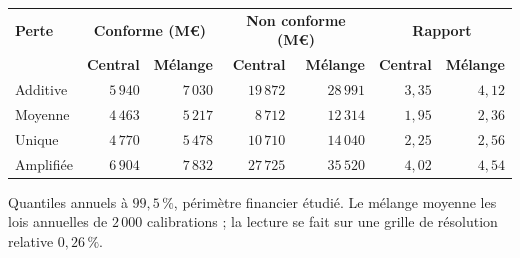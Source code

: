 \begin{center}\footnotesize
\renewcommand{\arraystretch}{1.15}
\begin{tabular}{@{}lrrrrrr@{}}
\toprule
\textbf{Perte} & \multicolumn{2}{c}{\textbf{Conforme (M\euro)}} & \multicolumn{2}{c}{\textbf{Non conforme (M\euro)}} & \multicolumn{2}{c}{\textbf{Rapport}} \\
 & \textbf{Central} & \textbf{Mélange} & \textbf{Central} & \textbf{Mélange} & \textbf{Central} & \textbf{Mélange} \\
\midrule
Additive & $5\,940$ & $7\,030$ & $19\,872$ & $28\,991$ & $3{,}35$ & $4{,}12$ \\
Moyenne & $4\,463$ & $5\,217$ & $8\,712$ & $12\,314$ & $1{,}95$ & $2{,}36$ \\
Unique & $4\,770$ & $5\,478$ & $10\,710$ & $14\,040$ & $2{,}25$ & $2{,}56$ \\
Amplifiée & $6\,904$ & $7\,832$ & $27\,725$ & $35\,520$ & $4{,}02$ & $4{,}54$ \\
\bottomrule
\end{tabular}
\end{center}
\noindent Quantiles annuels à $99{,}5\,\%$, périmètre financier étudié. Le mélange moyenne les lois annuelles de $2\,000$ calibrations ; la lecture se fait sur une grille de résolution relative $0{,}26\,\%$.
